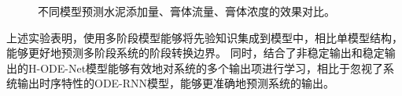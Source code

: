 \begin{figure}
\caption{不同模型预测水泥添加量、膏体流量、膏体浓度的效果对比。} %
\label{fig:4_paste_models}  %
\end{figure}
上述实验表明，使用多阶段模型能够将先验知识集成到模型中，相比单模型结构，能够更好地预测多阶段系统的阶段转换边界。
同时，结合了非稳定输出和稳定输出的H-ODE-Net模型能够有效地对系统的多个输出项进行学习，相比于忽视了系统输出时序特性的ODE-RNN模型，能够更准确地预测系统的输出。

